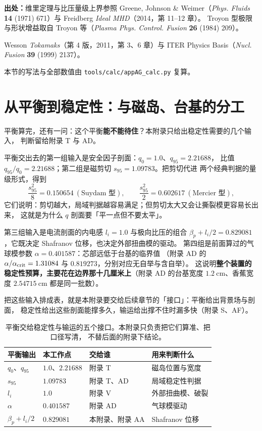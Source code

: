 {\footnotesize
\textbf{出处：}维里定理与比压量级上界参照 Greene, Johnson \& Weimer（\emph{Phys. Fluids} \textbf{14} (1971) 671）与 Freidberg \emph{Ideal MHD}（2014，第 11--12 章）。
Troyon 型极限与形状增益取自 Troyon 等（\emph{Plasma Phys. Control. Fusion} \textbf{26} (1984) 209）。

Wesson \emph{Tokamaks}（第 4 版，2011，第 3、6 章）与 ITER Physics Basis（\emph{Nucl. Fusion} \textbf{39} (1999) 2137）。

本节的写法与全部数值由
\texttt{tools/\allowbreak{}calc/\allowbreak{}appAG\_calc.py} 复算。
}

\section{从平衡到稳定性：与磁岛、台基的分工}
\label{sec:app-ag-stability}

平衡算完，还有一问：这个平衡\textbf{能不能待住}？本附录只给出稳定性需要的几个输入，
判断留给附录 T 与 AD。

平衡交出去的第一组输入是安全因子剖面：$q_0=1.0$、$q_{95}=2.21688$，
比值 $q_{95}/q_0 = 2.21688$；第二组是磁剪切 $s_{95}=1.09783$。把剪切代进
两个经典判据的量级形式，得到
\begin{equation}
\frac{s_{95}^2}{8} = 0.150654\ (\text{Suydam 型}),
\qquad
\frac{s_{95}^2}{2} = 0.602617\ (\text{Mercier 型}),
\label{eq:app-ag-suydam}
\end{equation}
它们说明：剪切越大，局域判据越容易满足；但剪切太大又会让撕裂模更容易长出来，
这就是为什么 $q$ 剖面要「平一点但不要太平」。

第三组输入是电流剖面的内电感 $l_i=1.0$ 与极向比压的组合
$\beta_p + l_i/2 = 0.829081$，它既决定 Shafranov 位移，也决定外部扭曲模的驱动。
第四组是前面算过的气球模参数 $\alpha=0.401587$：芯部远低于台基的临界值
（附录 AD 的 $\alpha/\alpha_{\rm crit}=1.31084$ 与 $0.819273$，分别对应无自举与含自举）。
这说明\textbf{整个装置的稳定性预算，主要花在边界那十几厘米上}（附录 AD 的台基宽度
$1.2\ \mathrm{cm}$、香蕉宽度 $2.54715\ \mathrm{cm}$ 都是同一批数）。

把这些输入排成表，就是本附录要交给后续章节的「接口」：平衡给出背景场与剖面，
稳定性给出这些剖面能撑多久，输运给出撑不住时漏多快（附录 S、AF）。

\begin{table}[htbp]
\centering
\small
\caption{平衡交给稳定性与输运的五个接口。本附录只负责把它们算准、把口径写清，
不替后面的附录下结论。}
\label{tab:app-ag-stability}
\begin{tabular}{p{3.6cm}p{2.8cm}p{3.2cm}p{4.0cm}}
\toprule
平衡输出 & 本工作点 & 交给谁 & 用来判断什么 \\
\midrule
$q_0$、$q_{95}$ & $1.0$、$2.21688$ & 附录 T & 磁岛位置与宽度 \\
$s_{95}$ & $1.09783$ & 附录 T、AD & 局域稳定性判据 \\
$l_i$ & $1.0$ & 附录 V & 外部扭曲模、破裂 \\
$\alpha$ & $0.401587$ & 附录 AD & 气球模驱动 \\
$\beta_p+l_i/2$ & $0.829081$ & 本附录、附录 AA & Shafranov 位移 \\
\bottomrule
\end{tabular}

\end{table}

